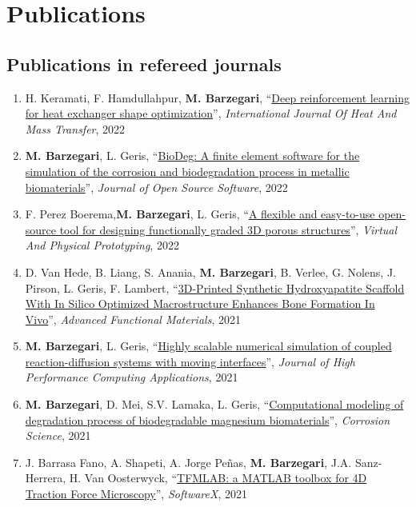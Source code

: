 \documentclass{cv}
\begin{document}

\section{Publications}

\subsection{Publications in refereed journals}
\begin{enumerate}[itemsep=-0.2ex]
\item
H. Keramati, F. Hamdullahpur, \textbf{M. Barzegari}, ``\href{https://doi.org/10.1016/j.ijheatmasstransfer.2022.123112}{Deep reinforcement learning for heat exchanger shape optimization}'', \textit{International  Journal Of Heat And Mass Transfer}, 2022
\item
\textbf{M. Barzegari}, L. Geris, ``\href{https://doi.org/10.21105/joss.04281}{BioDeg: A finite element software for the simulation of the corrosion and biodegradation process in metallic biomaterials}'', \textit{Journal of Open Source Software}, 2022
\item
F. Perez Boerema,\textbf{M. Barzegari}, L. Geris, ``\href{https://doi.org/10.1080/17452759.2022.2048956}{A flexible and easy-to-use open-source tool for designing functionally graded 3D porous structures}'', \textit{Virtual And Physical Prototyping}, 2022
\item
D. Van Hede, B. Liang, S. Anania, \textbf{M. Barzegari}, B. Verlee, G. Nolens, J. Pirson, L. Geris, F. Lambert, ``\href{https://doi.org/10.1002/adfm.202105002}{3D-Printed Synthetic Hydroxyapatite Scaffold With In Silico Optimized Macrostructure Enhances Bone Formation In Vivo}'', \textit{Advanced Functional Materials}, 2021
\item
\textbf{M. Barzegari}, L. Geris, ``\href{https://doi.org/10.1177/10943420211045939}{Highly scalable numerical simulation of coupled reaction-diffusion systems with moving interfaces}'', \textit{Journal of High Performance Computing Applications}, 2021
\item
\textbf{M. Barzegari}, D. Mei, S.V. Lamaka, L. Geris, ``\href{https://doi.org/10.1016/j.corsci.2021.109674}{Computational modeling of degradation process of biodegradable magnesium biomaterials}'', \textit{Corrosion Science}, 2021
\item
J. Barrasa Fano, A. Shapeti, A. Jorge Peñas, \textbf{M. Barzegari}, J.A. Sanz-Herrera, H. Van Oosterwyck, ``\href{https://doi.org/10.1016/j.softx.2021.100723}{TFMLAB: a MATLAB toolbox for 4D Traction Force Microscopy}'', \textit{SoftwareX}, 2021 

\end{enumerate}
\end{document}
